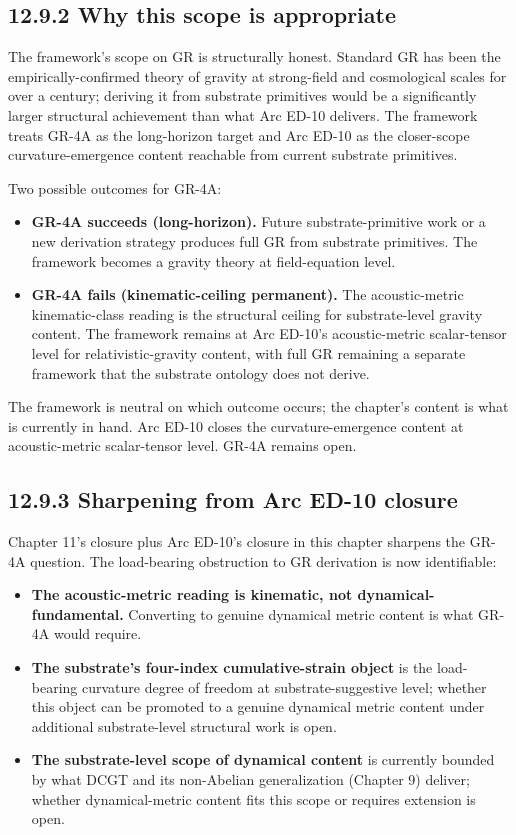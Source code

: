 \documentclass[11pt]{book}
\begin{document}
\subsection{12.9.2 Why this scope is appropriate}

The framework's scope on GR is structurally honest. Standard GR has been the empirically-confirmed theory of gravity at strong-field and cosmological scales for over a century; deriving it from substrate primitives would be a significantly larger structural achievement than what Arc ED-10 delivers. The framework treats GR-4A as the long-horizon target and Arc ED-10 as the closer-scope curvature-emergence content reachable from current substrate primitives.

Two possible outcomes for GR-4A:
\begin{itemize}
\item \textbf{GR-4A succeeds (long-horizon).} Future substrate-primitive work or a new derivation strategy produces full GR from substrate primitives. The framework becomes a gravity theory at field-equation level.
\item \textbf{GR-4A fails (kinematic-ceiling permanent).} The acoustic-metric kinematic-class reading is the structural ceiling for substrate-level gravity content. The framework remains at Arc ED-10's acoustic-metric scalar-tensor level for relativistic-gravity content, with full GR remaining a separate framework that the substrate ontology does not derive.
\end{itemize}

The framework is neutral on which outcome occurs; the chapter's content is what is currently in hand. Arc ED-10 closes the curvature-emergence content at acoustic-metric scalar-tensor level. GR-4A remains open.

\subsection{12.9.3 Sharpening from Arc ED-10 closure}

Chapter 11's closure plus Arc ED-10's closure in this chapter sharpens the GR-4A question. The load-bearing obstruction to GR derivation is now identifiable:

\begin{itemize}
\item \textbf{The acoustic-metric reading is kinematic, not dynamical-fundamental.} Converting to genuine dynamical metric content is what GR-4A would require.
\item \textbf{The substrate's four-index cumulative-strain object} is the load-bearing curvature degree of freedom at substrate-suggestive level; whether this object can be promoted to a genuine dynamical metric content under additional substrate-level structural work is open.
\item \textbf{The substrate-level scope of dynamical content} is currently bounded by what DCGT and its non-Abelian generalization (Chapter 9) deliver; whether dynamical-metric content fits this scope or requires extension is open.
\end{itemize}
\end{document}
